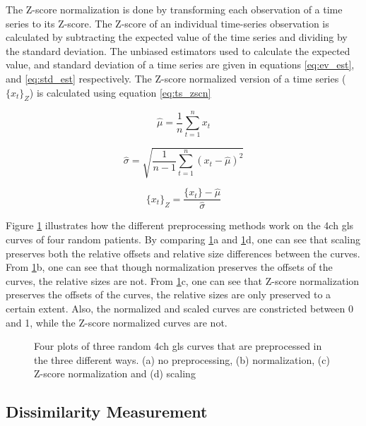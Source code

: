 The Z-score normalization is done by transforming each observation of a time series to its Z-score. The Z-score of an individual time-series observation is calculated by subtracting the expected value of the time series and dividing by the standard deviation. The unbiased estimators used to calculate the expected value, and standard deviation of a time series are given in equations \eqref{eq:ev_est}, and \eqref{eq:std_est} respectively. The Z-score normalized version of a time series ($\{x_t\}_Z$) is calculated using equation \eqref{eq:ts_zscn}

\begin{equation}
    \hat{\mu} = \frac{1}{n} \sum^n_{t = 1} x_t
    \label{eq:ev_est}
\end{equation}

\begin{equation}
    \hat{\sigma} = \sqrt{\frac{1}{n - 1} \sum^n_{t = 1} (x_t - \hat{\mu})^2}
    \label{eq:std_est}
\end{equation}

\begin{equation}
    \{x_t\}_Z = \frac{\{x_t\} - \hat{\mu}}{\hat{\sigma}}
    \label{eq:ts_zscn}
\end{equation}

Figure \ref{fig:preproc} illustrates how the different preprocessing methods work on the \acrshort{4ch} \acrshort{gls} curves of four random patients. By comparing \ref{fig:preproc}a and \ref{fig:preproc}d, one can see that scaling preserves both the relative offsets and relative size differences between the curves. From \ref{fig:preproc}b, one can see that though normalization preserves the offsets of the curves, the relative sizes are not. From \ref{fig:preproc}c, one can see that Z-score normalization preserves the offsets of the curves, the relative sizes are only preserved to a certain extent. Also, the normalized and scaled curves are constricted between 0 and 1, while the Z-score normalized curves are not.  

\begin{figure}
    \centering
    
    \caption{Four plots of three random \acrshort{4ch} \acrshort{gls} curves that are preprocessed in the three different ways. (a) no preprocessing, (b) normalization, (c) Z-score normalization and (d) scaling}
    \label{fig:preproc}
\end{figure}

\subsection{Dissimilarity Measurement}

